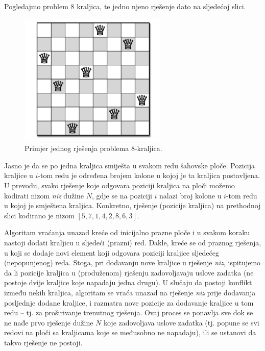\begin{solution}
           
      Pogledajmo problem 8 kraljica, te jedno njeno rješenje dato na sljedećoj slici.  
      \begin{figure}[H]
      	\centering
      	\includegraphics[width=200pt,height=180pt]{slike/n-queen-problem.png}
       \caption{Primjer jednog rješenja problema 8-kraljica.}\label{fig:8-queen-sol-example}
  \end{figure}

Jasno je da se po jedna kraljica smiješta u svakom redu šahovske ploče. Pozicija kraljice u $i$-tom redu je određena brojem kolone u kojoj je ta kraljica postavljena. U prevodu, svako rješenje koje odgovara poziciji kraljica na ploči možemo kodirati nizom \emph{niz} dužine $N$, gdje se na poziciji $i$ nalazi broj kolone u $i$-tom redu u kojoj je smještena kraljica. Konkretno, rješenje (pozicije kraljica)  na prethodnoj slici kodirano je nizom $[5, 7, 1, 4, 2, 8, 6, 3]$. 

Algoritam vraćanja unazad kreće od inicijalno prazne ploče i u svakom koraku nastoji dodati kraljicu u sljedeći (prazni) red. Dakle, kreće se od praznog rješenja, u koji se dodaje novi element   koji odgovara poziciji kraljice sljedećeg (nepopunjenog) reda. Stoga, pri dodavanju nove kraljice u rješenje \emph{niz}, ispitujemo da li pozicije kraljica u (produženom) rješenju  zadovoljavaju uslove zadatka (ne  postoje dvije kraljice koje napadaju jedna drugu). U slučaju da postoji konflikt između nekih kraljica, algoritam se vraća unazad na rješenje \emph{niz} prije dodavanja posljednje dodane kraljice, i razmatra nove pozicije za dodavanje kraljice u tom redu -- tj. za proširivanje trenutnog rješenja.  Ovaj proces se ponavlja sve dok se ne nađe prvo rješenje dužine $N$ koje zadovoljava uslove zadatka (tj. popune se svi redovi na ploči sa kraljicama koje se međusobno ne napadaju), ili se ustanovi da takvo rješenje ne postoji. 


\end{solution}
